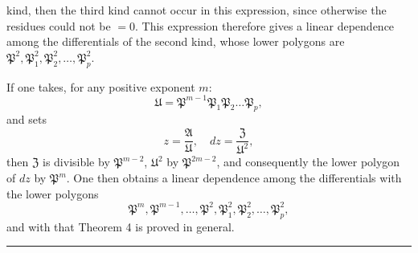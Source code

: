 kind, then the third kind cannot occur in this expression, since otherwise the residues could not be $=0$. This expression therefore gives a linear dependence among the differentials of the second kind, whose lower polygons are $\mathfrak P^2, \mathfrak P_1^2, \mathfrak P_2^2, \ldots, \mathfrak P_p^2$.

If one takes, for any positive exponent $m$:
\[
\mathfrak U = \mathfrak P^{m-1}\mathfrak P_1\mathfrak P_2\ldots\mathfrak P_p,
\]
and sets
\[
z = \frac{\mathfrak A}{\mathfrak U}, \quad dz = \frac{\mathfrak Z}{\mathfrak U^2},
\]
then $\mathfrak Z$ is divisible by $\mathfrak P^{m-2}$, $\mathfrak U^2$ by $\mathfrak P^{2m-2}$, and consequently the lower polygon of $dz$ by $\mathfrak P^m$. One then obtains a linear dependence among the differentials with the lower polygons
\[
\mathfrak P^m, \mathfrak P^{m-1}, \ldots, \mathfrak P^2, \mathfrak P_1^2, \mathfrak P_2^2, \ldots, \mathfrak P_p^2,
\]
and with that Theorem 4 is proved in general.

\begin{center}
\rule{4cm}{0.4pt}
\end{center}
